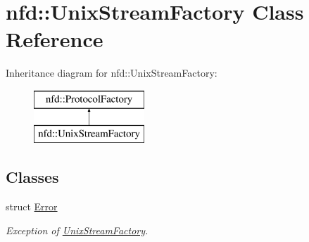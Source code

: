 \hypertarget{classnfd_1_1UnixStreamFactory}{}\section{nfd\+:\+:Unix\+Stream\+Factory Class Reference}
\label{classnfd_1_1UnixStreamFactory}
Inheritance diagram for nfd\+:\+:Unix\+Stream\+Factory\+:\begin{figure}[H]
\begin{center}
\leavevmode
\includegraphics[height=2.000000cm]{classnfd_1_1UnixStreamFactory}
\end{center}
\end{figure}
\subsection*{Classes}
\begin{DoxyCompactItemize}
\item 
struct \hyperlink{structnfd_1_1UnixStreamFactory_1_1Error}{Error}
\begin{DoxyCompactList}\small\item\em Exception of \hyperlink{classnfd_1_1UnixStreamFactory}{Unix\+Stream\+Factory}. \end{DoxyCompactList}\end{DoxyCompactItemize}
